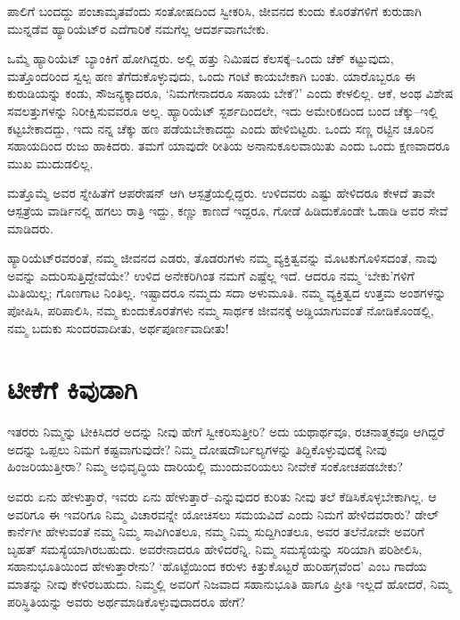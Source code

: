 ಪಾಲಿಗೆ ಬಂದದ್ದು ಪಂಚಾಮೃತವೆಂದು ಸಂತೋಷದಿಂದ ಸ್ವೀಕರಿಸಿ, ಜೀವನದ ಕುಂದು ಕೊರತೆಗಳಿಗೆ ಕುರುಡಾಗಿ ಮುನ್ನಡೆವ ಹ್ಯಾರಿಯೆಟ್​ರ ಎದೆಗಾರಿಕೆ ನಮಗೆಲ್ಲ ಆದರ್ಶವಾಗಬೇಕು.

ಒಮ್ಮೆ ಹ್ಯಾರಿಯೆಟ್ ಬ್ಯಾಂಕಿಗೆ ಹೋಗಿದ್ದರು. ಅಲ್ಲಿ ಹತ್ತು ನಿಮಿಷದ ಕೆಲಸಕ್ಕೆ–ಒಂದು ಚೆಕ್ ಕಟ್ಟುವುದು, ಮತ್ತೊಂದರಿಂದ ಸ್ವಲ್ಪ ಹಣ ತೆಗೆದುಕೊಳ್ಳುವುದು, ಒಂದು ಗಂಟೆ ಕಾಯಬೇಕಾಗಿ ಬಂತು. ಯಾರೊಬ್ಬರೂ ಈ ಕುರುಡಿಯನ್ನು ಕಂಡು, ಸೌಜನ್ಯಕ್ಕಾದರೂ, ‘ನಿಮಗೇನಾದರೂ ಸಹಾಯ ಬೇಕೆ?’ ಎಂದು ಕೇಳಲಿಲ್ಲ. ಆಕೆ, ಅಂಥ ವಿಶೇಷ ಸವಲತ್ತುಗಳನ್ನು ನಿರೀಕ್ಷಿಸುವವರೂ ಅಲ್ಲ. ಹ್ಯಾರಿಯೆಟ್ ಸ್ಪರ್ಶದಿಂದಲೇ, ಇದು ಅಮೇರಿಕದಿಂದ ಬಂದ ಚೆಕ್ಕು–ಇಲ್ಲಿ ಕಟ್ಟಬೇಕಾದದ್ದು, ಇದು ನನ್ನ ಚೆಕ್ಕು ಹಣ ಪಡೆಯಬೇಕಾದದ್ದು ಎಂದು ಹೇಳಿಬಿಟ್ಟರು. ಒಂದು ಸಣ್ಣ ರಟ್ಟಿನ ಚೂರಿನ ಸಹಾಯದಿಂದ ರುಜು ಹಾಕಿದರು. ತಮಗೆ ಯಾವುದೇ ರೀತಿಯ ಅನಾನುಕೂಲವಾಯಿತು ಎಂದು ಒಂದು ಕ್ಷಣವಾದರೂ ಮುಖ ಮುದುಡಲಿಲ್ಲ.

ಮತ್ತೊಮ್ಮೆ ಅವರ ಸ್ನೇಹಿತೆಗೆ ಆಪರೇಷನ್ ಆಗಿ ಆಸ್ಪತ್ರೆಯಲ್ಲಿದ್ದರು. ಉಳಿದವರು ಎಷ್ಟು ಹೇಳಿದರೂ ಕೇಳದೆ ತಾವೇ ಆಸ್ಪತ್ರೆಯ ವಾರ್ಡಿನಲ್ಲಿ ಹಗಲು ರಾತ್ರಿ ಇದ್ದು, ಕಣ್ಣು ಕಾಣದೆ ಇದ್ದರೂ, ಗೋಡೆ ಹಿಡಿದುಕೊಂಡೇ ಓಡಾಡಿ ಅವರ ಸೇವೆ ಮಾಡಿದರು.

ಹ್ಯಾರಿಯೆಟ್​ರವರಂತೆ, ನಮ್ಮ ಜೀವನದ ಎಡರು, ತೊಡರುಗಳು ನಮ್ಮ ವ್ಯಕ್ತಿತ್ವವನ್ನು ಮೊಟಕುಗೊಳಿಸದಂತೆ, ನಾವು ಅವನ್ನು ಎದುರಿಸುತ್ತಿದ್ದೇವೆಯೇ? ಉಳಿದ ಅನೇಕರಿಗಿಂತ ನಮಗೆ ಎಷ್ಟೆಲ್ಲ ಇದೆ. ಆದರೂ ನಮ್ಮ ‘ಬೇಕು’ಗಳಿಗೆ ಮಿತಿಯಿಲ್ಲ; ಗೊಣಗಾಟ ನಿಂತಿಲ್ಲ. ಇಷ್ಟಾದರೂ ನಮ್ಮದು ಸದಾ ಅಳುಮೂತಿ. ನಮ್ಮ ವ್ಯಕ್ತಿತ್ವದ ಉತ್ತಮ ಅಂಶಗಳನ್ನು ಪೋಷಿಸಿ, ಪರಿಪಾಲಿಸಿ, ನಮ್ಮ ಕುಂದುಕೊರತೆಗಳು ನಮ್ಮ ಸಾರ್ಥಕ ಜೀವನಕ್ಕೆ ಅಡ್ಡಿಯಾಗುವಂತೆ ನೋಡಿಕೊಂಡಲ್ಲಿ, ನಮ್ಮ ಬದುಕು ಸುಂದರವಾದೀತು, ಅರ್ಥಪೂರ್ಣವಾದೀತು!


\section*{ಟೀಕೆಗೆ ಕಿವುಡಾಗಿ}

\vskip -7pt

ಇತರರು ನಿಮ್ಮನ್ನು ಟೀಕಿಸಿದರೆ ಅದನ್ನು ನೀವು ಹೇಗೆ ಸ್ವೀಕರಿಸುತ್ತೀರಿ? ಅದು ಯಥಾರ್ಥವೂ, ರಚನಾತ್ಮಕವೂ ಆಗಿದ್ದರೆ ಅದನ್ನು ಒಪ್ಪಲು ನಿಮಗೆ ಕಷ್ಟವಾಗುವುದೇ? ನಿಮ್ಮ ದೋಷದೌರ್ಬಲ್ಯಗಳನ್ನು ತಿದ್ದಿಕೊಳ್ಳುವುದಕ್ಕೆ ನೀವು ಹಿಂಜರಿಯುತ್ತೀರಾ? ನಿಮ್ಮ ಅಭಿವೃದ್ಧಿಯ ದಾರಿಯಲ್ಲಿ ಮುಂದುವರಿಯಲು ನೀವೇಕೆ ಸಂಕೋಚಪಡಬೇಕು?

ಅವರು ಏನು ಹೇಳುತ್ತಾರೆ, ಇವರು ಏನು ಹೇಳುತ್ತಾರೆ–ಎನ್ನುವುದರ ಕುರಿತು ನೀವು ತಲೆ ಕೆಡಿಸಿಕೊಳ್ಳಬೇಕಾಗಿಲ್ಲ. ಆ ಅವರಿಗೂ ಈ ಇವರಿಗೂ ನಿಮ್ಮ ವಿಚಾರವನ್ನೇ ಯೋಚಿಸಲು ಸಮಯವಿದೆ ಎಂದು ನಿಮಗೆ ಹೇಳಿದವರಾರು? ಡೇಲ್ ಕಾರ್ನೆಗೀ ಹೇಳುವಂತೆ ನಮ್ಮ ನಿಮ್ಮ ಸಾವಿಗಿಂತಲೂ, ನಮ್ಮ ನಿಮ್ಮ ಸುದ್ದಿಗಿಂತಲೂ, ಅವರ ತಲೆನೋವೇ ಅವರಿಗೆ ಬೃಹತ್ ಸಮಸ್ಯೆಯಾಗಿರಬಹುದು. ಅವರೇನಾದರೂ ಹೇಳಿದರೆನ್ನಿ. ನಿಮ್ಮ ಸಮಸ್ಯೆಯನ್ನು ಸರಿಯಾಗಿ ಪರಿಶೀಲಿಸಿ, ಸಹಾನುಭೂತಿಯಿಂದ ಹೇಳುತ್ತಾರೇನು? ‘ಹೊಟ್ಟೆಯಿಂದ ಕರುಳು ಕಿತ್ತುಕೊಟ್ಟರೆ ಹುರಿಹಗ್ಗ\-ವೆಂದ’ ಎಂಬ ಗಾದೆಯ ಮಾತನ್ನು ನೀವು ಕೇಳಿರಬಹುದು. ನಿಮ್ಮಲ್ಲಿ ಅವರಿಗೆ ನಿಜವಾದ ಸಹಾನುಭೂತಿ ಹಾಗೂ ಪ್ರೀತಿ ಇಲ್ಲದೆ ಹೋದರೆ, ನಿಮ್ಮ ಪರಿಸ್ಥಿತಿಯನ್ನು ಅವರು ಅರ್ಥಮಾಡಿಕೊಳ್ಳುವುದಾದರೂ ಹೇಗೆ?

